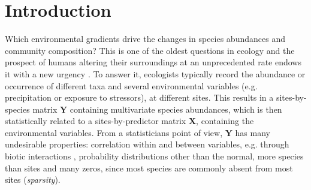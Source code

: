 


\section{Introduction}


	Which environmental gradients drive the changes in species abundances and community composition?
	This is one of the oldest questions in ecology \citep[e.g.][]{Clements1907}  and the prospect of humans altering their surroundings at an unprecedented rate endows it with a new urgency \citep{pacifici2015assessing}.
	To answer 	it, ecologists typically record the abundance or occurrence of different taxa and several environmental variables (e.g. precipitation or exposure to stressors), at different sites.
	This results in a sites-by-species matrix $\mathbf{Y}$ containing multivariate species abundances, which is then statistically related to  a sites-by-predictor matrix $\mathbf{X}$, containing the environmental variables.
	From a statisticians point of view, $\mathbf{Y}$ has many undesirable properties: 
	correlation within and between variables, 
	e.g. through biotic interactions \citep{morales2015inferring},
	probability distributions other than the normal, 
	more species than sites \citep[\textit{high dimensionality}, especially in DNA Barcoding studies, ][]{cristescu2014barcoding}  
	and many zeros, since most species are commonly absent from most sites (\textit{sparsity}). \\
	
	

